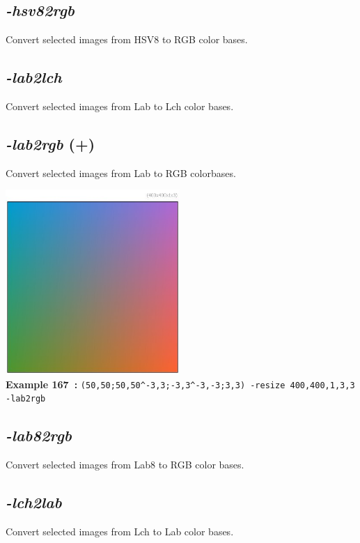 \documentclass[a4paper,11pt,twoside]{book}
\begin{document}
\subsection{\emph{-hsv82rgb} }\vspace*{-0.5em}
Convert selected images from HSV8 to RGB color bases.


\subsection{\emph{-lab2lch} }\vspace*{-0.5em}
Convert selected images from Lab to Lch color bases.


\subsection{\emph{-lab2rgb} (+)}\vspace*{-0.5em}
Convert selected images from Lab to RGB colorbases.
\begin{center}\includegraphics[keepaspectratio=true,height=7cm,width=\textwidth]{img/gmic_def167.jpg}\\
{\footnotesize \textbf{Example 167~:} \texttt{(50,50;50,50\textasciicircum -3,3;-3,3\textasciicircum -3,-3;3,3) -resize 400,400,1,3,3 -lab2rgb}}
\end{center}

\subsection{\emph{-lab82rgb} }\vspace*{-0.5em}
Convert selected images from Lab8 to RGB color bases.


\subsection{\emph{-lch2lab} }\vspace*{-0.5em}
Convert selected images from Lch to Lab color bases.
\end{document}
